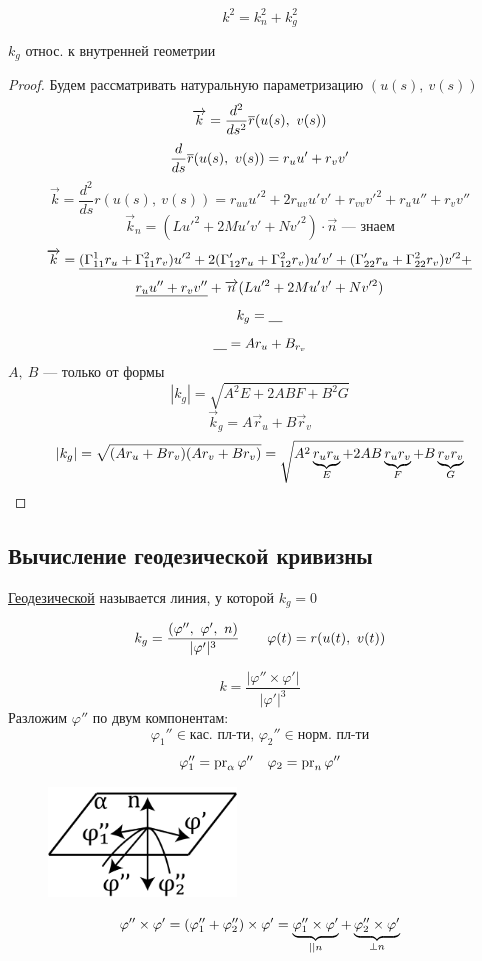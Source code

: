 \documentclass[main]{subfiles}
\begin{document}
    \begin{Property}
        \[k^2 = k_n^2 + k_g^2\]
    \end{Property}

    \begin{theorem}
        $k_g$ относ. к внутренней геометрии
    \end{theorem}

    \begin{proof}
        Будем рассматривать натуральную параметризацию $(u(s),\ v(s))$
        \[\vec{k} = \frac{d^2}{d s^2} \ol{r}(u(s),\ v(s))\]
        \[\frac{d}{ds} \ol{r} (u(s),\ v(s)) = r_u u' + r_v v'\]
        \[\vec{k} = \frac{d^2}{ds} r(u(s),\ v(s)) = r_{uu} u'^2 + 2 r_{uv} u' v' + r_{vv} v'^2 + r_u u'' + r_v v''\]
        \[\vec{k}_n = (L u'^2 + 2 M u' v' + N v'^2) \cdot \vec{n} \text{ --- знаем}\]
        \[\vec{k} = \ul{(\Gamma_{11}^1 r_u + \Gamma_{11}^2 r_v) u'^2 + 2 (\Gamma_{12}' r_u + \Gamma_{12}^2 r_v) u' v' + (\Gamma_{22}' r_u + \Gamma_{22}^2 r_v) v'^2 +}\] %
        \[\ul{r_u u'' + r_v v''} + \vec{n}(Lu'^2 + 2Mu'v' + Nv'^2)\]
        \[k_g = \ul{\q}\]
        \[\ul{\q} = A r_u + B_{r_v}\]
        $A,\ B$ --- только от  формы
        \[|k_g| = \sqrt{A^2 E + 2ABF + B^2 G}\]
        \[\vec{k}_g = A \vec{r}_u + B \vec{r}_v\]
        \[|k_g| = \sqrt{(A r_u + B r_v)(A r_v + B r_v)} = \sqrt{A^2 \ub{E}{r_u r_u} + 2 AB \ub{F}{r_u r_v} + B\ub{G}{r_v r_v}}\]
    \end{proof}

    \subsection{Вычисление геодезической кривизны}
    \begin{definition}
        \ul{Геодезической} называется линия, у которой $k_g = 0$
    \end{definition}

    \begin{Utv}[формула]
        \[k_g = \frac{(\varphi'',\ \varphi',\ n)}{|\varphi'|^3} \qq \varphi(t) = r(u(t),\ v(t))\]
    \end{Utv}

    \begin{Proof}
        \[k = \frac{|\varphi'' \times \varphi'|}{|\varphi'|^3}\]
        Разложим $\varphi''$ по двум компонентам:
        \[\varphi_1'' \in \text{кас. пл-ти, } \varphi_2'' \in \text{норм. пл-ти}\]
        \[\varphi_1'' = \pr_{\alpha} \varphi'' \q \varphi_2 = \pr_n \varphi''\]
        \begin{figure}[H]
            \includegraphics[width=5cm]{pics/11_3.png}
            \centering
        \end{figure}
        \[\varphi'' \times \varphi' = (\varphi''_1 + \varphi''_2) \times \varphi' = \ub{||n}{\varphi''_1 \times \varphi'} + \ub{\bot n}{\varphi''_2 \times \varphi'}\]
    \end{Proof}
\end{document}
